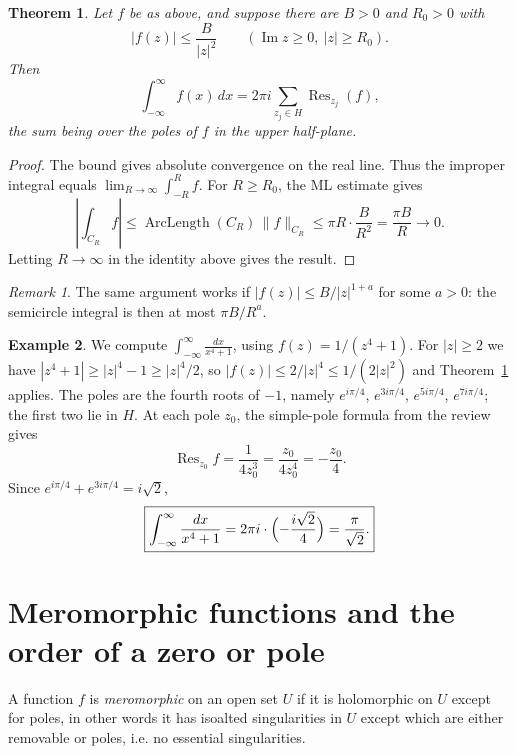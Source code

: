 \documentclass[11pt]{article}
\theoremstyle{plain}
\newtheorem{theorem}{Theorem}[section]
\theoremstyle{definition}
\newtheorem{example}[theorem]{Example}
\newtheorem{exercise}[theorem]{Exercise}
\theoremstyle{remark}
\newtheorem*{remark}{Remark}
\numberwithin{equation}{section}
\DeclareMathOperator{\Imag}{Im}
\begin{document}
\begin{theorem}\label{thm:improper}
Let $f$ be as above, and suppose there are $B>0$ and $R_0>0$ with
\[
 |f(z)|\leq\frac{B}{|z|^2}\qquad(\Imag z\geq0,\ |z|\geq R_0).
\]
Then
\[
 \boxed{\displaystyle\int_{-\infty}^{\infty}f(x)\,dx
 =2\pi i\sum_{z_j\in H}\operatorname{Res}_{z_j}(f),}
\]
the sum being over the poles of $f$ in the upper half-plane.
\end{theorem}
\begin{proof}
The bound gives absolute convergence on the real line. Thus the improper
integral equals $\lim_{R\to\infty}\int_{-R}^Rf$. For $R\geq R_0$, the
ML estimate gives
\[
 \left|\int_{C_R}f\right|
 \leq\operatorname{ArcLength}(C_R)\,\|f\|_{C_R}
 \leq\pi R\cdot\frac{B}{R^2}=\frac{\pi B}{R}\longrightarrow0.
\]
Letting $R\to\infty$ in the identity above gives the result.
\end{proof}

\begin{remark}
The same argument works if $|f(z)|\leq B/|z|^{1+a}$ for some $a>0$: the
semicircle integral is then at most $\pi B/R^a$.
\end{remark}

\begin{example}
We compute $\displaystyle\int_{-\infty}^{\infty}\frac{dx}{x^4+1}$, using
$f(z)=1/(z^4+1)$. For $|z|\geq2$ we have $|z^4+1|\geq|z|^4-1\geq|z|^4/2$,
so $|f(z)|\leq2/|z|^4\leq1/(2|z|^2)$ and Theorem~\ref{thm:improper} applies.
The poles are the fourth roots of $-1$, namely $e^{i\pi/4}$,
$e^{3i\pi/4}$, $e^{5i\pi/4}$, $e^{7i\pi/4}$; the first two lie in $H$.
At each pole $z_0$, the simple-pole formula from the review gives
\[
 \operatorname{Res}_{z_0}f=\frac{1}{4z_0^3}=\frac{z_0}{4z_0^4}=-\frac{z_0}{4}.
\]
Since $e^{i\pi/4}+e^{3i\pi/4}=i\sqrt2$,
\[
 \boxed{\int_{-\infty}^{\infty}\frac{dx}{x^4+1}
 =2\pi i\cdot\Bigl(-\frac{i\sqrt2}{4}\Bigr)=\frac{\pi}{\sqrt2}.}
\]
\end{example}


\section{Meromorphic functions and the order of a zero or pole}
A function $f$ is \emph{meromorphic} on an open set $U$ if it is
holomorphic on $U$ except for poles, in other words it has isoalted singularities in $U$ except which are either removable or poles, i.e. no essential singularities.
\end{document}
